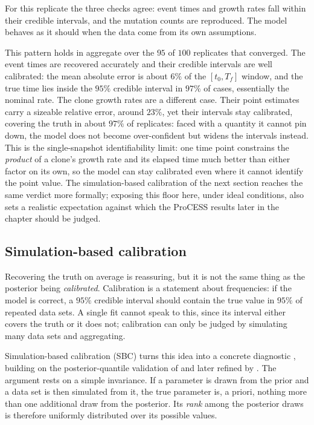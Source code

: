 For this replicate the three checks agree: event times and growth rates fall within
their credible intervals, and the mutation counts are reproduced. The model behaves as
it should when the data come from its own assumptions.

This pattern holds in aggregate over the $95$ of $100$ replicates that converged.
The event times are recovered accurately and their credible intervals are well
calibrated: the mean absolute error is about $6\%$ of the $[t_0,T_f]$ window, and
the true time lies inside the $95\%$ credible interval in $97\%$ of cases, essentially
the nominal rate. The clone growth rates are a different case. Their point estimates
carry a sizeable relative error, around $23\%$, yet their intervals stay calibrated,
covering the truth in about $97\%$ of replicates: faced with a quantity it cannot pin
down, the model does not become over-confident but widens the intervals instead. This is the single-snapshot
identifiability limit: one time point constrains the \emph{product} of a clone's
growth rate and its elapsed time much better than either factor on its own, so the
model can stay calibrated even where it cannot identify the point value. The simulation-based
calibration of the next section reaches the same verdict more formally; exposing
this floor here, under ideal conditions, also sets a realistic expectation against
which the ProCESS results later in the chapter should be judged.

\subsection{Simulation-based calibration}

Recovering the truth on average is reassuring, but it is not the same thing as the
posterior being \emph{calibrated}. Calibration is a statement about frequencies:
if the model is correct, a $95\%$ credible interval should contain the true value
in $95\%$ of repeated data sets. A single fit cannot speak to this, since its
interval either covers the truth or it does not; calibration can only be judged by
simulating many data sets and aggregating.

Simulation-based calibration (SBC) turns this idea into a concrete diagnostic
\parencite{talts2018validating}, building on the posterior-quantile validation of
\textcite{cook2006validation} and later refined by \textcite{modrak2023simulation}.
The argument rests on a simple invariance. If a parameter is drawn from the prior
and a data set is then simulated from it, the true parameter is, a priori, nothing
more than one additional draw from the posterior. Its \emph{rank} among the
posterior draws is therefore uniformly distributed over its possible values.

